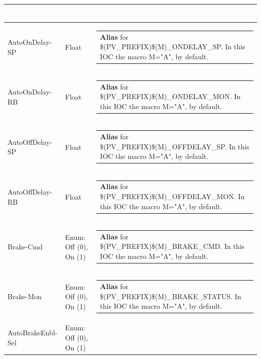 \documentclass[openany]{article}
\begin{document}
\begin{longtable}{| m{4.5cm} m{2.5cm}  m{8.5cm} |}
\begin{tabular}{@{}m{6cm}@{}}
            \end{tabular} \hypertarget{pv:auto-on-delay}{}\\ \hline
        AutoOnDelay-SP & Float & \begin{tabular}{@{}m{6cm}@{}}
                \textbf{\color{blue} Alias} for \$(PV\_PREFIX)\$(M)\_ONDELAY\_SP. In this IOC the macro M="A", by default.
            \end{tabular} \hypertarget{}{}\\ \hline
        AutoOnDelay-RB & Float & \begin{tabular}{@{}m{6cm}@{}}
                \textbf{\color{blue} Alias} for \$(PV\_PREFIX)\$(M)\_ONDELAY\_MON. In this IOC the macro M="A", by default.
            \end{tabular} \hypertarget{pv:auto-off-delay}{}\\ \hline
        AutoOffDelay-SP & Float & \begin{tabular}{@{}m{6cm}@{}}
                \textbf{\color{blue} Alias} for \$(PV\_PREFIX)\$(M)\_OFFDELAY\_SP. In this IOC the macro M="A", by default.
            \end{tabular} \hypertarget{}{}\\ \hline
        AutoOffDelay-RB & Float & \begin{tabular}{@{}m{6cm}@{}}
                \textbf{\color{blue} Alias} for \$(PV\_PREFIX)\$(M)\_OFFDELAY\_MON. In this IOC the macro M="A", by default.
            \end{tabular} \hypertarget{pv:brake-cmd}{}\\ \hline
        Brake-Cmd & Enum: Off (0), On (1) & \begin{tabular}{@{}m{6cm}@{}}
                \textbf{\color{blue} Alias} for \$(PV\_PREFIX)\$(M)\_BRAKE\_CMD. In this IOC the macro M="A", by default.
            \end{tabular} \hypertarget{pv:brake-mon}{}\\ \hline
        Brake-Mon & Enum: Off (0), On (1) & \begin{tabular}{@{}m{6cm}@{}}
                \textbf{\color{blue} Alias} for \$(PV\_PREFIX)\$(M)\_BRAKE\_STATUS. In this IOC the macro M="A", by default.
            \end{tabular} \hypertarget{pv:auto-brake-enbl}{}\\ \hline
        AutoBrakeEnbl-Sel & Enum: Off (0), On (1) & \begin{tabular}{@{}m{6cm}@{}}

\end{tabular}
\end{longtable}
\end{document}
